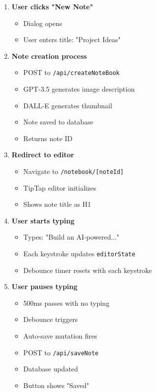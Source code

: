\documentclass[11pt,a4paper]{article}
\begin{document}
\begin{enumerate}
    \item \textbf{User clicks "New Note"}
    \begin{itemize}
        \item Dialog opens
        \item User enters title: "Project Ideas"
    \end{itemize}
    
    \item \textbf{Note creation process}
    \begin{itemize}
        \item POST to \texttt{/api/createNoteBook}
        \item GPT-3.5 generates image description
        \item DALL-E generates thumbnail
        \item Note saved to database
        \item Returns note ID
    \end{itemize}
    
    \item \textbf{Redirect to editor}
    \begin{itemize}
        \item Navigate to \texttt{/notebook/[noteId]}
        \item TipTap editor initializes
        \item Shows note title as H1
    \end{itemize}
    
    \item \textbf{User starts typing}
    \begin{itemize}
        \item Types: "Build an AI-powered..."
        \item Each keystroke updates \texttt{editorState}
        \item Debounce timer resets with each keystroke
    \end{itemize}
    
    \item \textbf{User pauses typing}
    \begin{itemize}
        \item 500ms passes with no typing
        \item Debounce triggers
        \item Auto-save mutation fires
        \item POST to \texttt{/api/saveNote}
        \item Database updated
        \item Button shows "Saved"
    \end{itemize}
    

\end{enumerate}
\end{document}
